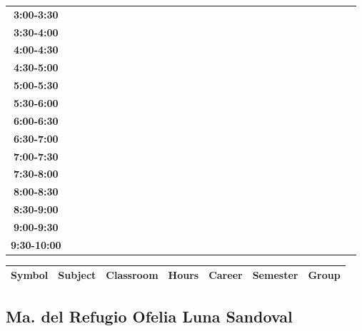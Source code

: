 \documentclass{article}
\begin{document}
\begin{table}[ht]
\begin{tabular}{|c|c|c|c|c|c|c|c|c|c|c|c|c|c|c|c|c|c|c|c|c|c|c|c|c|c|c|c|c|c|}
\textbf{3:00-3:30} &   &   &   &   &   &   &   \\
 \cline{1-8} 
\textbf{3:30-4:00} &   &   &   &   &   &   &   \\
 \cline{1-8} 
\textbf{4:00-4:30} &   &   &   &   &   &   &   \\
 \cline{1-8} 
\textbf{4:30-5:00} &   &   &   &   &   &   &   \\
 \cline{1-8} 
\textbf{5:00-5:30} &   &   &   &   &   &   &   \\
 \cline{1-8} 
\textbf{5:30-6:00} &   &   &   &   &   &   &   \\
 \cline{1-8} 
\textbf{6:00-6:30} &   &   &   &   &   &   &   \\
 \cline{1-8} 
\textbf{6:30-7:00} &   &   &   &   &   &   &   \\
 \cline{1-8} 
\textbf{7:00-7:30} &   &   &   &   &   &   &   \\
 \cline{1-8} 
\textbf{7:30-8:00} &   &   &   &   &   &   &   \\
 \cline{1-8} 
\textbf{8:00-8:30} &   &   &   &   &   &   &   \\
 \cline{1-8} 
\textbf{8:30-9:00} &   &   &   &   &   &   &   \\
 \cline{1-8} 
\textbf{9:00-9:30} &   &   &   &   &   &   &   \\
 \cline{1-8} 
\textbf{9:30-10:00} &   &   &   &   &   &   &   \\
 \cline{1-8} 
\end{tabular}\end{table}

        
        \begin{tabular}{|>{\centering\arraybackslash}m{2cm}|>{\centering\arraybackslash}m{4cm}|>{\centering\arraybackslash}m{2cm}|>{\centering\arraybackslash}m{2cm}|>{\centering\arraybackslash}m{2cm}|>{\centering\arraybackslash}m{2cm}|>{\centering\arraybackslash}m{2cm}|}
        \hline
        \textbf{Symbol} & \textbf{Subject} & \textbf{Classroom} & \textbf{Hours} & \textbf{Career} & \textbf{Semester} & \textbf{Group} \\
        \hline
        \end{tabular}
                    

        \newpage
        

        \subsection{Ma. del Refugio Ofelia Luna Sandoval}
        \vspace*{.1cm}
        
\end{document}
